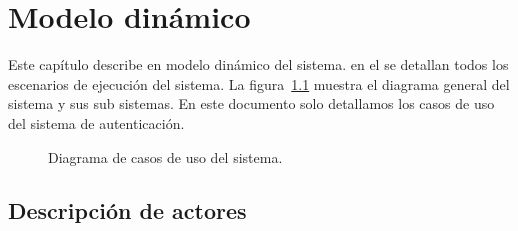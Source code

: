 \chapter{Modelo dinámico}	
\label{cap:modDinamico}

	Este capítulo describe en modelo dinámico del sistema. en el se detallan todos los escenarios de ejecución del sistema. La figura~\ref{fig:casosDeUso} muestra el diagrama general del sistema y sus sub sistemas. En este documento solo detallamos los casos de uso del sistema de autenticación.
	
\begin{figure}[htbp]
	\begin{center}
		\caption{Diagrama de casos de uso del sistema.}
		\label{fig:casosDeUso}
	\end{center}
\end{figure}

\section{Descripción de actores}

